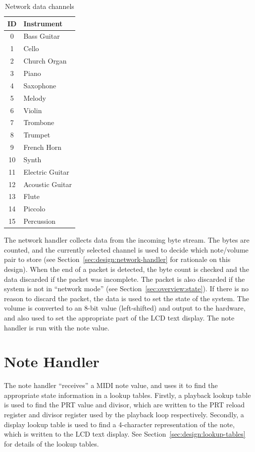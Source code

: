 \begin{nowordcount}
\begin{table}[htbp]
\centering
\begin{tabular}{c | l}
ID & Instrument \\
\hline\hline
0 & Bass Guitar \\
1 & Cello \\
2 & Church Organ \\
3 & Piano \\
4 & Saxophone \\
5 & Melody \\
6 & Violin \\
7 & Trombone \\
8 & Trumpet \\
9 & French Horn \\
10 & Synth \\
11 & Electric Guitar \\
12 & Acoustic Guitar \\
13 & Flute \\
14 & Piccolo \\
15 & Percussion
\end{tabular}
\caption{Network data channels}\label{tab:channelids}
\end{table}
\end{nowordcount}

The network handler collects data from the incoming byte stream.  The bytes are counted, and the 
currently selected channel is used to decide which note/volume pair to store (see 
Section~\ref{sec:design:network-handler} for rationale on this design).  When the end of a packet is 
detected, the byte count is checked and the data discarded if the packet was incomplete.  The packet 
is also discarded if the system is not in ``network mode'' (see Section~\ref{sec:overview:state}).
If there is no reason to discard the packet, the data is used to set the state of the system.  The 
volume is converted to an 8-bit value (left-shifted) and output to the hardware, and also used to 
set the appropriate part of the LCD text display.  The note handler is run with the note value.

\section{Note Handler}
\label{sec:overview:note-handler}

The note handler ``receives'' a MIDI note value, and uses it to find the appropriate state 
information in a lookup tables.  Firstly, a playback lookup table is used to find the PRT value and 
divisor, which are written to the PRT reload register and divisor register used by the playback loop 
respectively.  Secondly, a display lookup table is used to find a 4-character representation of the 
note, which is written to the LCD text display.  See Section~\ref{sec:design:lookup-tables} for 
details of the lookup tables.

